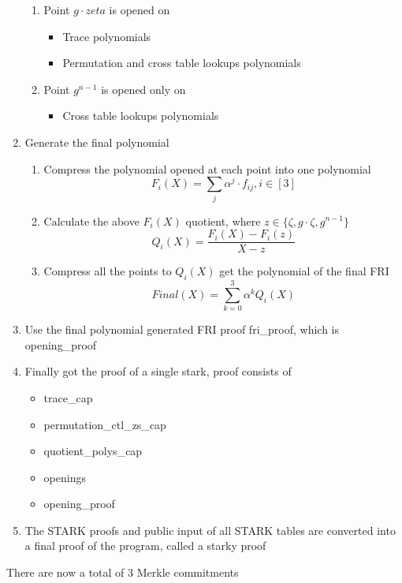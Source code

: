 \begin{enumerate}
\begin{enumerate}
        \item Point $g \cdot zeta$ is opened on
            \begin{itemize}
                \item Trace polynomials
                \item Permutation and cross table lookups polynomials
            \end{itemize}
        \item Point $ g^{n-1} $ is opened only on
            \begin{itemize}
                \item Cross table lookups polynomials
            \end{itemize}
        \end{enumerate}
    \item Generate the final polynomial
        \begin{enumerate}
            \item Compress the polynomial opened at each point into one polynomial $$ F_i(X) = \sum_{j} \alpha^j \cdot f_{ij}, i \in [3] $$
            \item Calculate the above $ F_i(X) $ quotient, where $ z \in \{ \zeta, g \cdot \zeta, g^{n-1} \} $ $$ Q_i(X) = \frac{F_i(X) - F_i(z)}{X - z} $$
            \item Compress all the points to $ Q_i(X) $ get the polynomial of the final FRI $$ Final(X) = \sum_{k=0}^3 \alpha^k Q_i(X) $$
        \end{enumerate}
    \item Use the final polynomial generated FRI proof fri\_proof, which is opening\_proof
    \item Finally got the proof of a single stark, proof consists of
        \begin{itemize}
            \item trace\_cap
            \item permutation\_ctl\_zs\_cap
            \item quotient\_polys\_cap
            \item openings
            \item opening\_proof
        \end{itemize}
    \item The STARK proofs and public input of all STARK tables are converted into a final proof of the program, called a starky proof
\end{enumerate}

\noindent There are now a total of 3 Merkle commitments

